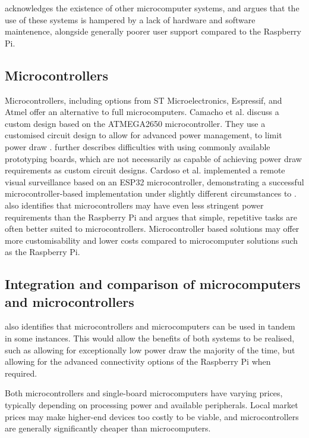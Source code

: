 \documentclass[class=report,11pt,crop=false]{standalone}
\begin{document}
\cite{jolles2021broad-scale} acknowledges the existence of other microcomputer systems, and argues that the use of these systems is hampered by a lack of hardware and software maintenence, alongside generally poorer user support compared to the Raspberry Pi. 

\subsection{Microcontrollers}

Microcontrollers, including options from ST Microelectronics, Espressif, and Atmel offer an alternative to full microcomputers. Camacho et al. \cite{camacho2017deployment} discuss a custom design based on the ATMEGA2650 microcontroller. They use a customised circuit design to allow for advanced power management, to limit power draw \cite{camacho2017deployment}. \cite{camacho2017deployment} further describes difficulties with using commonly available prototyping boards, which are not necessarily as capable of achieving power draw requirements as custom circuit designs. Cardoso et al. \cite{cardoso2022internet} implemented a remote visual surveillance based on an ESP32 microcontroller, demonstrating a successful microcontroller-based implementation under slightly different circumstances to \cite{camacho2017deployment}. \cite{jolles2021broad-scale} also identifies that microcontrollers may have even less stringent power requirements than the Raspberry Pi and argues that simple, repetitive tasks are often better suited to microcontrollers. Microcontroller based solutions may offer more customisability and lower costs compared to microcomputer solutions such as the Raspberry Pi.

\subsection{Integration and comparison of microcomputers and microcontrollers}

\cite{jolles2021broad-scale} also identifies that microcontrollers and microcomputers can be used in tandem in some instances. This would allow the benefits of both systems to be realised, such as allowing for exceptionally low power draw the majority of the time, but allowing for the advanced connectivity options of the Raspberry Pi when required.

Both microcontrollers and single-board microcomputers have varying prices, typically depending on processing power and available peripherals. Local market prices may make higher-end devices too costly to be viable, and microcontrollers are generally significantly cheaper than microcomputers.
\end{document}

